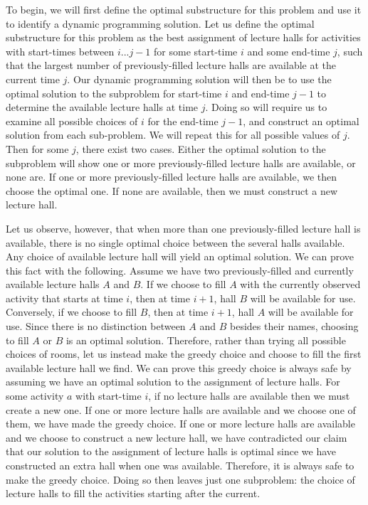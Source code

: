 \documentclass[11pt]{article}
\begin{document}
To begin, we will first define the optimal substructure for this problem and use it to identify a dynamic programming solution. Let us define the optimal substructure for this problem as the best assignment of lecture halls for activities with start-times between $i...j-1$ for some start-time $i$ and some end-time $j$, such that the largest number of previously-filled lecture halls are available at the current time $j$. Our dynamic programming solution will then be to use the optimal solution to the subproblem for start-time $i$ and end-time $j-1$ to determine the available lecture halls at time $j$. Doing so will require us to examine all possible choices of $i$ for the end-time $j-1$, and construct an optimal solution from each sub-problem. We will repeat this for all possible values of $j$. Then for some $j$, there exist two cases. Either the optimal solution to the subproblem will show one or more previously-filled lecture halls are available, or none are. If one or more previously-filled lecture halls are available, we then choose the optimal one. If none are available, then we must construct a new lecture hall.

Let us observe, however, that when more than one previously-filled lecture hall is available, there is no single optimal choice between the several halls available. Any choice of available lecture hall will yield an optimal solution. We can prove this fact with the following. Assume we have two previously-filled and currently available lecture halls $A$ and $B$. If we choose to fill $A$ with the currently observed activity that starts at time $i$, then at time $i+1$, hall $B$ will be available for use. Conversely, if we choose to fill $B$, then at time $i+1$, hall $A$ will be available for use. Since there is no distinction between $A$ and $B$ besides their names, choosing to fill $A$ or $B$ is an optimal solution. Therefore, rather than trying all possible choices of rooms, let us instead make the greedy choice and choose to fill the first available lecture hall we find. We can prove this greedy choice is always safe by assuming we have an optimal solution to the assignment of lecture halls. For some activity $a$ with start-time $i$, if no lecture halls are available then we must create a new one. If one or more lecture halls are available and we choose one of them, we have made the greedy choice. If one or more lecture halls are available and we choose to construct a new lecture hall, we have contradicted our claim that our solution to the assignment of lecture halls is optimal since we have constructed an extra hall when one was available. Therefore, it is always safe to make the greedy choice. Doing so then leaves just one subproblem: the choice of lecture halls to fill the activities starting after the current.
\end{document}
